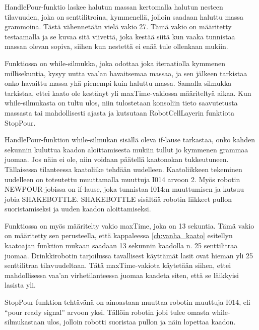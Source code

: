 HandlePour-funktio laskee halutun massan kertomalla halutun nesteen tilavuuden, joka on senttilitroina, kymmenellä, jolloin saadaan haluttu massa grammoina. Tästä vähennetään vielä vakio 27. Tämä vakio on määritetty testaamalla ja se kuvaa sitä viivettä, joka kestää siitä kun vaaka tunnistaa massan olevan sopiva, siihen kun nestettä ei enää tule ollenkaan mukiin.

Funktiossa on while-silmukka, joka odottaa joka iteraatiolla kymmenen millisekuntia, kysyy uutta vaa'an havaitsemaa massaa, ja sen jälkeen tarkistaa onko havaittu massa yhä pienempi kuin haluttu massa. Samalla silmukka tarkistaa, ettei kaato ole kestänyt yli maxTime-vakiossa määriteltyä aikaa. Kun while-silmukasta on tultu ulos, niin tulostetaan konsoliin tieto saavutetusta massasta tai mahdollisesti ajasta ja kutsutaan RobotCellLayerin funktiota StopPour.

HandlePour-funktion while-silmukan sisällä oleva if-lause tarkastaa, onko kahden sekunnin kuluttua kaadon aloittamisesta mukiin tullut jo kymmenen grammaa juomaa. Jos näin ei ole, niin voidaan päätellä kaatonokan tukkeutuneen. Tällaisessa tilanteessa kaatoliike tehdään uudelleen. Kaatoliikkeen tekeminen uudelleen on toteutettu muuttamalla muuttuja I014 arvoon 2. Myös robotin NEWPOUR-jobissa on if-lause, joka tunnistaa I014:n muuttumisen ja kutsuu jobia SHAKEBOTTLE. SHAKEBOTTLE sisältää robotin liikkeet pullon suoristamiseksi ja uuden kaadon aloittamiseksi.

Funktiossa on myös määritelty vakio maxTime, joka on 13 sekuntia. Tämä vakio on määritetty sen perusteella, että kappaleessa \ref{ch:vanha_kaato} esitellyn kaatoajan funktion mukaan saadaan 13 sekunnin kaadolla n. 25 senttilitraa juomaa. Drinkkirobotin tarjoilussa tavallisest käyttämät lasit ovat hieman yli 25 senttilitraa tilavuudeltaan. Tätä maxTime-vakiota käytetään siihen, ettei mahdollisessa vaa'an virhetilanteessa juomaa kaadeta siten, että se läikkyisi lasista yli.

StopPour-funktion tehtävänä on ainoastaan muuttaa robotin muuttuja I014, eli ``pour ready signal'' arvoon yksi. Tällöin robotin jobi tulee omasta while-silmukastaan ulos, jolloin robotti suoristaa pullon ja näin lopettaa kaadon.

\newpage

